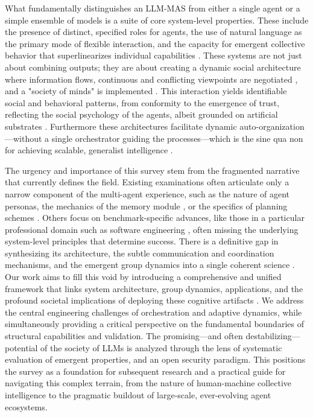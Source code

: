 \documentclass[11pt,a4paper]{article}
\begin{document}
What fundamentally distinguishes an LLM-MAS from either a single agent or a simple ensemble of models is a suite of core system-level properties. These include the presence of distinct, specified roles for agents, the use of natural language as the primary mode of flexible interaction, and the capacity for emergent collective behavior that superlinearizes individual capabilities \cite{arxiv:2406.07155v1,arxiv:2406.04692v1}. These systems are not just about combining outputs; they are about creating a dynamic social architecture where information flows, continuous and conflicting viewpoints are negotiated \cite{arxiv:2305.19118v1}, and a "society of minds" is implemented \cite{arxiv:2307.04738v1}. This interaction yields identifiable social and behavioral patterns, from conformity to the emergence of trust, reflecting the social psychology of the agents, albeit grounded on artificial substrates \cite{arxiv:2310.02124v2}. Furthermore these architectures facilitate dynamic auto-organization---without a single orchestrator guiding the processes---which is the sine qua non for achieving scalable, generalist intelligence \cite{arxiv:2310.02170v1,arxiv:2404.02183v1}.

The urgency and importance of this survey stem from the fragmented narrative that currently defines the field. Existing examinations often articulate only a narrow component of the multi-agent experience, such as the nature of agent personas, the mechanics of the memory module \cite{arxiv:2404.13501v1}, or the specifics of planning schemes \cite{arxiv:2402.02716v1}. Others focus on benchmark-specific advances, like those in a particular professional domain such as software engineering \cite{arxiv:2409.02977v1}, often missing the underlying system-level principles that determine success. There is a definitive gap in synthesizing its architecture, the subtle communication and coordination mechanisms, and the emergent group dynamics into a single coherent science \cite{arxiv:2402.01680v2}. Our work aims to fill this void by introducing a comprehensive and unified framework that links system architecture, group dynamics, applications, and the profound societal implications of deploying these cognitive artifacts \cite{arxiv:2406.04151v1}. We address the central engineering challenges of orchestration and adaptive dynamics, while simultaneously providing a critical perspective on the fundamental boundaries of structural capabilities and validation. The promising---and often destabilizing---potential of the society of LLMs is analyzed through the lens of systematic evaluation of emergent properties, and an open security paradigm. This positions the survey as a foundation for subsequent research and a practical guide for navigating this complex terrain, from the nature of human-machine collective intelligence to the pragmatic buildout of large-scale, ever-evolving agent ecosystems.
\end{document}
